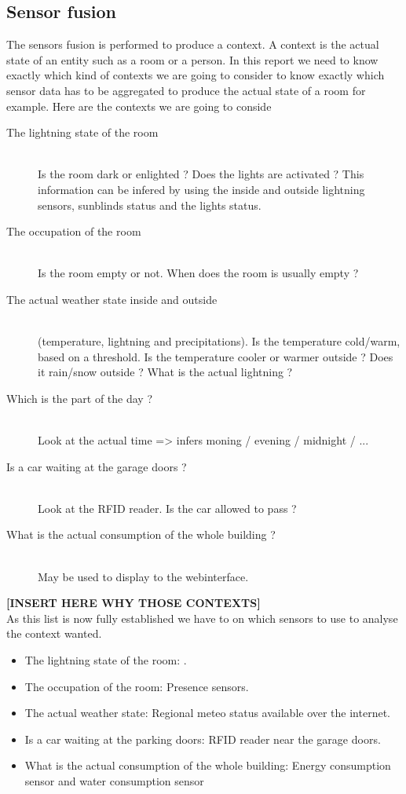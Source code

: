 \documentclass{acm_proc_article-sp}
\begin{document}
\subsection{Sensor fusion}
The sensors fusion is performed to produce a context. A context is the actual state of an entity such as a room or a person. In this report we need to know exactly which kind of contexts we are going to consider to know exactly which sensor data has to be aggregated to produce the actual state of a room for example. Here are the contexts we are going to conside
\begin{description}
 \item[The lightning state of the room]\hfill \\ 
 Is the room dark or enlighted ? Does the lights are activated ? This information can
 be infered by using the inside and outside lightning sensors, sunblinds status and the lights status.
 \item[The occupation of the room]\hfill \\ 
 Is the room empty or not. When does the room is usually empty ?
 \item[The actual weather state inside and outside]\hfill \\
 (temperature, lightning and precipitations). 
 Is the temperature cold/warm, based on a threshold. Is the temperature cooler or warmer outside ? 
 Does it rain/snow outside ? What is the actual lightning ?
 \item[Which is the part of the day ?] \hfill \\
 Look at the actual time => infers moning / evening / midnight / ...
 \item[Is a car waiting at the garage doors ?] \hfill \\
  Look at the RFID reader. Is the car allowed to pass ?
 \item[What is the actual consumption of the whole building ?]\hfill \\
 May be used to display to the webinterface.
\end{description}
\textbf{[INSERT HERE WHY THOSE CONTEXTS]}\\
As this list is now fully established we have to on which sensors to use to analyse the context wanted.
\begin{itemize}
 \item The lightning state of the room: .
 \item The occupation of the room: Presence sensors.
 \item The actual weather state: Regional meteo status available over the internet.
 \item Is a car waiting at the parking doors: RFID reader near the garage doors.
 \item What is the actual consumption of the whole building: Energy consumption sensor and water consumption sensor
\end{itemize}
\end{document}
